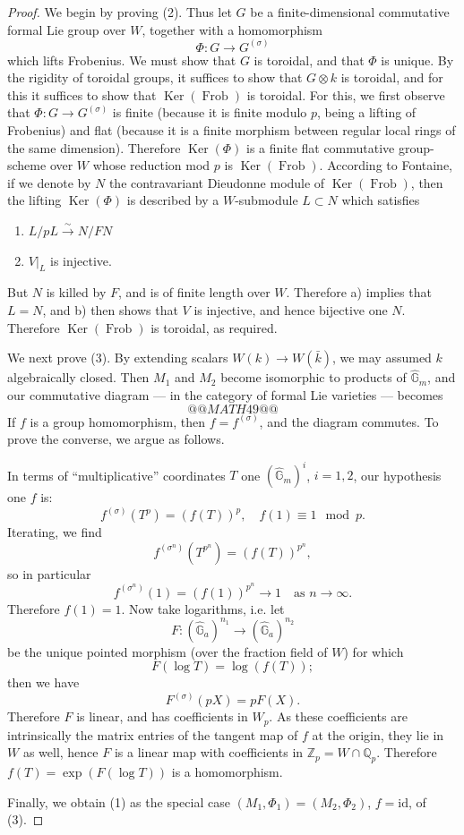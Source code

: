 \documentclass[12pt,a4paper]{article}
\theoremstyle{plain}
\theoremstyle{definition}
\theoremstyle{remark}
\DeclareMathOperator{\Ker}{Ker}
\DeclareMathOperator{\Frob}{Frob}
\providecommand{\Ker}{\operatorname{Ker}}
\begin{document}
\begin{proof}
We begin by proving (2). Thus let $G$ be a finite-dimensional commutative formal Lie group over $W$, together with a homomorphism
\[
\Phi : G \longrightarrow G^{(\sigma)}
\]
which lifts Frobenius. We must show that $G$ is toroidal, and that $\Phi$ is unique. By the rigidity of toroidal groups, it suffices to show that $G \otimes k$ is toroidal, and for this it suffices to show that $\Ker(\Frob)$ is toroidal. For this, we first observe that $\Phi : G \to G^{(\sigma)}$ is finite (because it is finite modulo $p$, being a lifting of Frobenius) and flat (because it is a finite morphism between regular local rings of the same dimension). Therefore $\Ker(\Phi)$ is a finite flat commutative group-scheme over $W$ whose reduction mod $p$ is $\Ker(\Frob)$. According to Fontaine, if we denote by $N$ the contravariant Dieudonne module of $\Ker(\Frob)$, then the lifting $\Ker(\Phi)$ is described by a $W$-submodule $L \subset N$ which satisfies
\begin{enumerate}[label=\alph*)]
\item $L/pL \xrightarrow{\sim} N/FN$
\item $V|_L$ is injective.
\end{enumerate}
But $N$ is killed by $F$, and is of finite length over $W$. Therefore a) implies that $L = N$, and b) then shows that $V$ is injective, and hence bijective one $N$. Therefore $\Ker(\Frob)$ is toroidal, as required.

We next prove (3). By extending scalars $W(k) \to W(\bar{k})$, we may assumed $k$ algebraically closed. Then $M_1$ and $M_2$ become isomorphic to products of $\hat{\mathbb{G}}_m$, and our commutative diagram --- in the category of formal Lie varieties --- becomes
\[
@@MATH49@@
\]
If $f$ is a group homomorphism, then $f = f^{(\sigma)}$, and the diagram commutes. To prove the converse, we argue as follows.

In terms of ``multiplicative'' coordinates $T$ one $(\hat{\mathbb{G}}_m)^i$, $i = 1, 2$, our hypothesis one $f$ is:
\[
f^{(\sigma)}(T^p) = (f(T))^p, \quad f(1) \equiv 1 \mod p.
\]
Iterating, we find
\[
f^{(\sigma^n)}(T^{p^n}) = (f(T))^{p^n},
\]
so in particular
\[
f^{(\sigma^n)}(1) = (f(1))^{p^n} \to 1 \quad \text{as } n \to \infty.
\]
Therefore $f(1) = 1$. Now take logarithms, i.e. let
\[
F : (\hat{\mathbb{G}}_a)^{n_1} \longrightarrow (\hat{\mathbb{G}}_a)^{n_2}
\]
be the unique pointed morphism (over the fraction field of $W$) for which
\[
F(\log T) = \log(f(T));
\]
then we have
\[
F^{(\sigma)}(pX) = pF(X).
\]
Therefore $F$ is linear, and has coefficients in $W_p$. As these coefficients are intrinsically the matrix entries of the tangent map of $f$ at the origin, they lie in $W$ as well, hence $F$ is a linear map with coefficients in $\mathbb{Z}_p = W \cap \mathbb{Q}_p$. Therefore $f(T) = \exp(F(\log T))$ is a homomorphism.

Finally, we obtain (1) as the special case $(M_1, \Phi_1) = (M_2, \Phi_2)$, $f = \mathrm{id}$, of (3). \qedhere
\end{proof}
\end{document}
